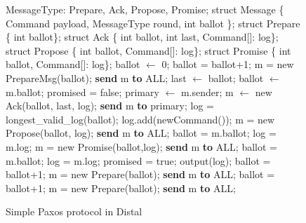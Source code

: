 \begin{figure}[h]
\begin{algorithmic}[1]
\scriptsize
\State MessageType: Prepare, Ack, Propose, Promise;
\State struct Message \{ Command payload, MessageType round, int ballot \};
\State struct Prepare \{ int ballot\}; 
\State struct Ack \{ int ballot, int last, Command[]: log\};
\State struct Propose \{ int ballot, Command[]: log\};
\State struct Promise \{ int ballot, Command[]: log\};
\Init
    \State ballot $\leftarrow$ 0;
        \State ballot = ballot+1;
        \State m = new PrepareMsg(ballot);
        \State \textbf{send} m \textbf{to} ALL;
    \EndIf
\EndInit
{}
     \label{example:prepare} 
        \State last $\leftarrow$ ballot; %
        \State ballot $\leftarrow$ m.ballot; promised = false; primary $\leftarrow$ m.sender;
        \State m $\leftarrow$ new Ack(ballot, last, log); \label{example:ackstart}
        \State \textbf{send} m \textbf{to} primary;
    \EndUpon
    \label{example:ack}
        \State log = longest\_valid\_log(ballot); log.add(newCommand());\label{example:newCommand}
        \State m = new Propose(ballot, log);
        \State \textbf{send} m \textbf{to} ALL;
    \EndUpon
     \label{example:propose} 
        \State ballot = m.ballot; log = m.log;
        \State m = new Promise(ballot,log);
        \State \textbf{send} m \textbf{to} ALL;
    \EndUpon
     \label{example:promise}
        \State ballot = m.ballot; log = m.log; promised = true; output(log);\label{example:output}
            \State ballot = ballot+1;
            \State m = new Prepare(ballot); \textbf{send} m \textbf{to} ALL;
        \EndIf
    \EndUpon
     \label{example:timeout}
            \State ballot = ballot+1;
            \State m = new Prepare(ballot);
            \State \textbf{send} m \textbf{to} ALL;
        \EndIf
    \EndUpon
\EndWhile
\end{algorithmic} 
\caption{Simple Paxos protocol in Distal}
\label{fig:example}
\end{figure}


